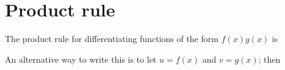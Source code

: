 \section{Product rule} \label{product rule}
The product rule for differentiating functions of the form $f(x)g(x)$ is

  	\bigskip
	
	\hfil{}
	\bigskip

\noindent An alternative way to write this is to let $u = f(x)$ and $v = g(x)$; then

  	\bigskip
	
	\hfil{}
	\bigskip


